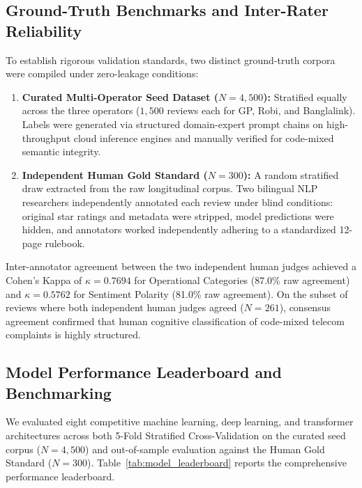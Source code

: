 \documentclass[review,12pt,authoryear]{elsarticle}
\begin{document}
\subsection{Ground-Truth Benchmarks and Inter-Rater Reliability}
To establish rigorous validation standards, two distinct ground-truth corpora were compiled under zero-leakage conditions:
\begin{enumerate}
    \item \textbf{Curated Multi-Operator Seed Dataset ($N = 4{,}500$):} Stratified equally across the three operators ($1{,}500$ reviews each for GP, Robi, and Banglalink). Labels were generated via structured domain-expert prompt chains on high-throughput cloud inference engines and manually verified for code-mixed semantic integrity.
    \item \textbf{Independent Human Gold Standard ($N = 300$):} A random stratified draw extracted from the raw longitudinal corpus. Two bilingual NLP researchers independently annotated each review under blind conditions: original star ratings and metadata were stripped, model predictions were hidden, and annotators worked independently adhering to a standardized 12-page rulebook.
\end{enumerate}

Inter-annotator agreement between the two independent human judges achieved a Cohen's Kappa \citep{cohen1960coefficient} of $\kappa = 0.7694$ for Operational Categories (87.0\% raw agreement) and $\kappa = 0.5762$ for Sentiment Polarity (81.0\% raw agreement). On the subset of reviews where both independent human judges agreed ($N = 261$), consensus agreement confirmed that human cognitive classification of code-mixed telecom complaints is highly structured.

\subsection{Model Performance Leaderboard and Benchmarking}
We evaluated eight competitive machine learning, deep learning, and transformer architectures across both 5-Fold Stratified Cross-Validation on the curated seed corpus ($N = 4{,}500$) and out-of-sample evaluation against the Human Gold Standard ($N = 300$). Table~\ref{tab:model_leaderboard} reports the comprehensive performance leaderboard.
\end{document}
